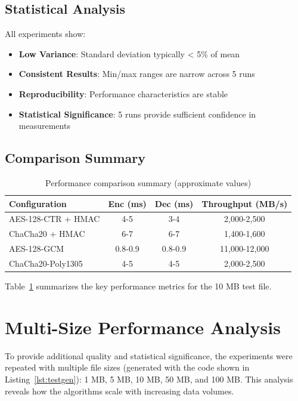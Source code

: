 \documentclass[12pt,a4paper]{article}
\begin{document}
\subsection{Statistical Analysis}

All experiments show:
\begin{itemize}
    \item \textbf{Low Variance}: Standard deviation typically < 5\% of mean
    \item \textbf{Consistent Results}: Min/max ranges are narrow across 5 runs
    \item \textbf{Reproducibility}: Performance characteristics are stable
    \item \textbf{Statistical Significance}: 5 runs provide sufficient confidence in measurements
\end{itemize}

\subsection{Comparison Summary}

\begin{table}[h]
\centering
\caption{Performance comparison summary (approximate values)}
\label{tab:summary}
\begin{tabular}{lccc}
\toprule
\textbf{Configuration} & \textbf{Enc (ms)} & \textbf{Dec (ms)} & \textbf{Throughput (MB/s)} \\
\midrule
AES-128-CTR + HMAC & 4-5 & 3-4 & 2,000-2,500 \\
ChaCha20 + HMAC & 6-7 & 6-7 & 1,400-1,600 \\
AES-128-GCM & 0.8-0.9 & 0.8-0.9 & 11,000-12,000 \\
ChaCha20-Poly1305 & 4-5 & 4-5 & 2,000-2,500 \\
\bottomrule
\end{tabular}
\end{table}

Table~\ref{tab:summary} summarizes the key performance metrics for the 10 MB test file.

\newpage

\section{Multi-Size Performance Analysis}

To provide additional quality and statistical significance, the experiments were repeated with multiple file sizes (generated with the code shown in Listing~\ref{lst:testgen}): 1 MB, 5 MB, 10 MB, 50 MB, and 100 MB. This analysis reveals how the algorithms scale with increasing data volumes.
\end{document}
